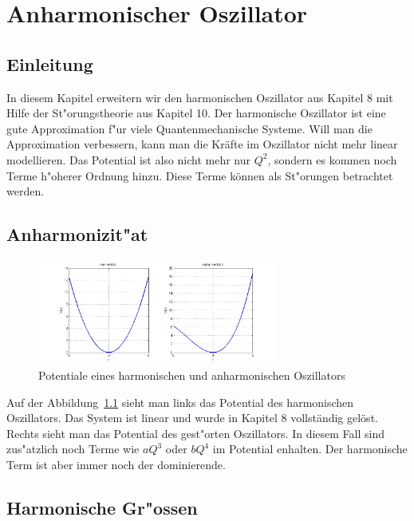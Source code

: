 \chapter{Anharmonischer Oszillator\label{chapter:anharmonisch}}
\begin{refsection}

\newpage
\section{Einleitung}
In diesem Kapitel erweitern wir den harmonischen Oszillator aus Kapitel 8 mit Hilfe der St"orungstheorie aus Kapitel 10. Der harmonische Oszillator ist eine gute Approximation f"ur viele Quantenmechanische Systeme. Will man die Approximation verbessern, kann man die Kräfte im Oszillator nicht mehr linear modellieren. Das Potential ist also nicht mehr nur $Q^2$, sondern es kommen noch Terme h"oherer Ordnung hinzu. Diese Terme können als St"orungen betrachtet werden.

\section{Anharmonizit"at}

\begin{figure}[h]	%
\centering
\includegraphics[width=0.7\textwidth]{anharmonisch/images/Potential.png}
\caption{Potentiale eines harmonischen und anharmonischen Oszillators
\label{skript:Potentiale}}
\end{figure}

Auf der Abbildung~\ref{skript:Potentiale} sieht man links das Potential des harmonischen Oszillators. Das System ist linear und wurde in Kapitel 8 vollständig gelöst. Rechts sieht man das Potential des gest"orten Oszillators. In diesem Fall sind zus"atzlich noch Terme wie $aQ^3$ oder $bQ^4$ im Potential enhalten. Der harmonische Term ist aber immer noch der dominierende.

\section{Harmonische Gr"ossen}


\end{refsection}
